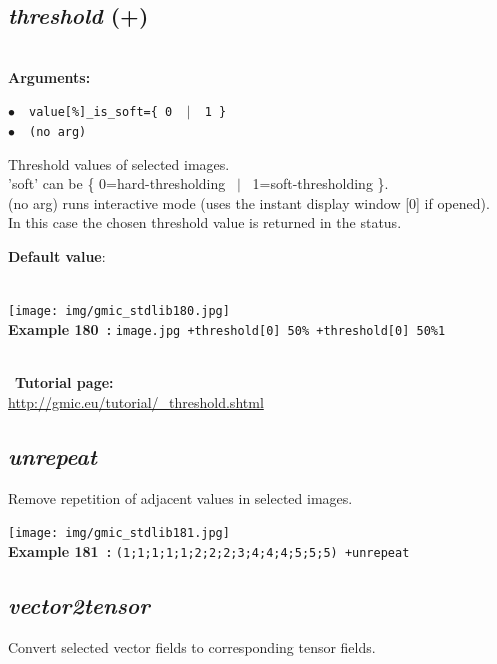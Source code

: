 \documentclass[a4paper,10.5pt,twoside]{book}
\def\comma{\discretionary{,}{}{,}}
\newcommand{\Cb}[1]{\textcolor{cb}{#1}}
\newcommand{\Cc}[1]{\textcolor{cc}{#1}}
\begin{document}
\subsection{\emph{threshold} (+)}\vspace*{-0.7em}
~\\\textbf{\Cb{Arguments: }}\begin{flushleft}
{\small \Cb{\hspace*{0.5cm}$\bullet$~~\texttt{value[\%]{\comma}\_is\_soft=\{ 0 ~$|$~ 1 \}}}}~~~\\
{\small \Cb{\hspace*{0.5cm}$\bullet$~~\texttt{(no arg)}}}\end{flushleft}
Threshold values of selected images.
~\\'soft' can be \{ 0=hard-thresholding ~$|$~ 1=soft-thresholding \}.
~\\(no arg) runs interactive mode (uses the instant display window [0] if opened).
~\\In this case{\comma} the chosen threshold value is returned in the status.
\begin{flushleft}\Cc{\textbf{Default value}:\\~\\\hspace*{0.5cm}{\small $\bullet$~~\texttt{'is\_soft=0'.}}}\end{flushleft}
\begin{center}\texttt{[image: img/gmic\_stdlib180.jpg]}\\
{\footnotesize \textbf{Example 180~:} \texttt{image.jpg +threshold[0] 50\% +threshold[0] 50\%{\comma}1}}
\end{center}
~\\
~\textbf{Tutorial page: }\\\url{http://gmic.eu/tutorial/\_threshold.shtml}


\subsection{\emph{unrepeat} }\vspace*{-0.7em}
Remove repetition of adjacent values in selected images.
\begin{center}\texttt{[image: img/gmic\_stdlib181.jpg]}\\
{\footnotesize \textbf{Example 181~:} \texttt{(1;1;1;1;1;2;2;2;3;4;4;4;5;5;5) +unrepeat}}
\end{center}

\subsection{\emph{vector2tensor} }\vspace*{-0.7em}
Convert selected vector fields to corresponding tensor fields.
\end{document}
